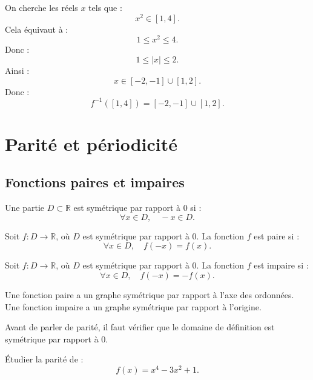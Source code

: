 \documentclass[11pt,a4paper]{article}
\newcommand{\R}{\mathbb R}
\begin{document}
\begin{correctionbox}
On cherche les réels \(x\) tels que :
\[
x^2\in[1,4].
\]
Cela équivaut à :
\[
1\leq x^2\leq 4.
\]
Donc :
\[
1\leq |x|\leq2.
\]
Ainsi :
\[
x\in[-2,-1]\cup[1,2].
\]
Donc :
\[
f^{-1}([1,4])=[-2,-1]\cup[1,2].
\]
\end{correctionbox}

\section{Parité et périodicité}

\subsection{Fonctions paires et impaires}

\begin{definitionbox}
Une partie \(D\subset\R\) est symétrique par rapport à \(0\) si :
\[
\forall x\in D,\quad -x\in D.
\]
\end{definitionbox}

\begin{definitionbox}
Soit \(f:D\to\R\), où \(D\) est symétrique par rapport à \(0\).  
La fonction \(f\) est paire si :
\[
\forall x\in D,\quad f(-x)=f(x).
\]
\end{definitionbox}

\begin{definitionbox}
Soit \(f:D\to\R\), où \(D\) est symétrique par rapport à \(0\).  
La fonction \(f\) est impaire si :
\[
\forall x\in D,\quad f(-x)=-f(x).
\]
\end{definitionbox}

\begin{retenirbox}
Une fonction paire a un graphe symétrique par rapport à l'axe des ordonnées.  
Une fonction impaire a un graphe symétrique par rapport à l'origine.
\end{retenirbox}

\begin{erreurbox}
Avant de parler de parité, il faut vérifier que le domaine de définition est symétrique par rapport à \(0\).
\end{erreurbox}

\begin{exercicebox}[Parité]
Étudier la parité de :
\[
f(x)=x^4-3x^2+1.
\]
\end{exercicebox}
\end{document}
